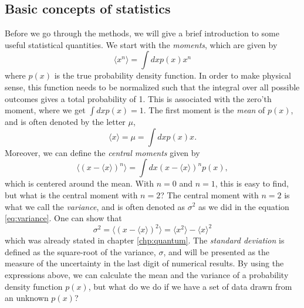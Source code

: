 \subsection{Basic concepts of statistics}
Before we go through the methods, we will give a brief introduction to some useful statistical quantities. We start with the \textit{moments}, which are given by
\begin{equation*}
\langle x^n\rangle=\int dxp(x)x^n
\end{equation*}
where $p(x)$ is the true probability density function. In order to make physical sense, this function needs to be normalized such that the integral over all possible outcomes gives a total probability of 1. This is associated with the zero'th moment, where we get $\int dxp(x)=1$. The first moment is the \textit{mean} of $p(x)$, and is often denoted by the letter $\mu$,
\begin{equation}
\langle x\rangle=\mu=\int dxp(x)x.
\end{equation}
Moreover, we can define the \textit{central moments} given by
\begin{equation}
\langle(x-\langle x\rangle)^n\rangle=\int dx(x-\langle x\rangle)^np(x),
\end{equation}
which is centered around the mean. With $n=0$ and $n=1$, this is easy to find, but what is the central moment with $n=2$? The central moment with $n=2$ is what we call the \textit{variance}, and is often denoted as $\sigma^2$ as we did in the equation \eqref{eq:variance}. One can show that
\begin{equation}
\sigma^2=\langle(x-\langle x\rangle)^2\rangle=\langle x^2\rangle - \langle x \rangle^2
\label{eq:variance2}
\end{equation}
which was already stated in chapter \ref{chp:quantum}. The \textit{standard deviation} is defined as the square-root of the variance, $\sigma$, and will be presented as the measure of the uncertainty in the last digit of numerical results. By using the expressions above, we can calculate the mean and the variance of a probability density function $p(x)$, but what do we do if we have a set of data drawn from an unknown $p(x)$?

